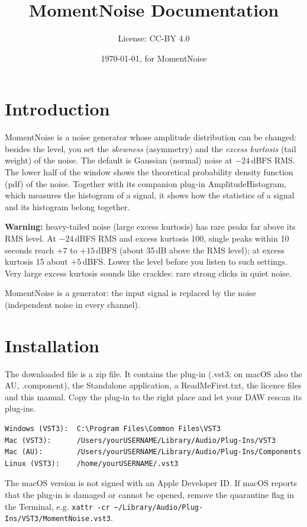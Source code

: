 \documentclass[12pt]{article}
\title{MomentNoise Documentation}
\author{License: CC-BY 4.0}
\date{\today, for MomentNoise \pluginversion}
\begin{document}
\maketitle

\section{Introduction}
MomentNoise is a noise generator whose amplitude distribution can be changed: besides the level,
you set the \emph{skewness} (asymmetry) and the \emph{excess kurtosis} (tail weight) of the noise. The
default is Gaussian (normal) noise at $-24$\,dBFS RMS. The lower half of the window shows the
theoretical probability density function (pdf) of the noise. Together with its companion plug-in
AmplitudeHistogram, which measures the histogram of a signal, it shows how the statistics of a
signal and its histogram belong together.

\textbf{Warning:} heavy-tailed noise (large excess kurtosis) has rare peaks far above its RMS level.
At $-24$\,dBFS RMS and excess kurtosis 100, single peaks within 10 seconds reach $+7$ to $+15$\,dBFS
(about 35\,dB above the RMS level); at excess kurtosis 15 about $+5$\,dBFS. Lower the level before you
listen to such settings. Very large excess kurtosis sounds like crackles: rare strong clicks in quiet
noise.

MomentNoise is a generator: the input signal is replaced by the noise (independent noise in every
channel).

\section{Installation}
The downloaded file is a zip file. It contains the plug-in (.vst3; on macOS also the AU,
.component), the Standalone application, a ReadMeFirst.txt, the licence files and this manual.
Copy the plug-in to the right place and let your DAW rescan its plug-ins.

\begin{verbatim}
Windows (VST3):  C:\Program Files\Common Files\VST3
Mac (VST3):      /Users/yourUSERNAME/Library/Audio/Plug-Ins/VST3
Mac (AU):        /Users/yourUSERNAME/Library/Audio/Plug-Ins/Components
Linux (VST3):    /home/yourUSERNAME/.vst3
\end{verbatim}

The macOS version is not signed with an Apple Developer ID. If macOS reports that the plug-in
is damaged or cannot be opened, remove the quarantine flag in the Terminal, e.g.
\texttt{xattr -cr \textasciitilde/Library/Audio/Plug-Ins/VST3/MomentNoise.vst3}.
\end{document}
